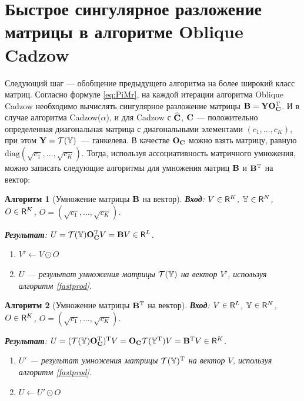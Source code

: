 \documentclass[12pt, specialist, subf,href,colorlinks=true,substylefile = spbu.rtx]{disser}
\newtheorem{algorithm}{Алгоритм}
\theoremstyle{remark}
\theoremstyle{definition}
\begin{document}

\section{Быстрое сингулярное разложение матрицы в алгоритме Oblique Cadzow}
Следующий шаг --- обобщение предыдущего алгоритма на более широкий класс матриц. Согласно формуле \eqref{eq:PiMr}, на каждой итерации алгоритма Oblique Cadzow необходимо вычислять сингулярное разложение матрицы $\mathbf{B} = \mathbf{Y} \mathbf{O}_{\mathbf{C}}^{\mathrm{T}}$. И в случае алгоритма Cadzow($\alpha$), и для Cadzow с $\widehat {\mathbf{C}}$, $\mathbf{C}$ --- положительно определенная диагональная матрица с диагональными элементами $(c_1, \ldots, c_K)$, при этом $\mathbf{Y} = \mathcal{T}(\mathbb{Y})$~--- ганкелева. В качестве $\mathbf{O}_{\mathbf{C}}$ можно взять матрицу, равную $\text{diag}(\sqrt{c_1}, \ldots, \sqrt{c_K})$. Тогда, используя ассоциативность матричного умножения, можно записать следующие алгоритмы для умножения матриц $\mathbf{B}$ и $\mathbf{B}^{\mathrm{T}}$ на вектор:
\begin{algorithm}[Умножение матрицы $\mathbf{B}$ на вектор]
	\textbf{Вход}: $V \in \mathsf{R}^K$, $\mathbb{Y} \in \mathsf{R}^N$, $O \in \mathsf{R}^K$, $O = (\sqrt{c_1}, \ldots, \sqrt{c_K})$.
	
	\textbf{Результат}:
	$U = \mathcal{T}(\mathbb{Y}) \mathbf{O}_{\mathbf{C}}^{\mathrm{T}} V = \mathbf{B} V \in \mathsf{R}^L$.
	
	\begin{enumerate}
		\item
		$V' \leftarrow V \odot O$
		\item
		$U$ --- результат умножения матрицы $\mathcal{T}(\mathbb{Y})$ на вектор $V'$, используя алгоритм \ref{fastprod}.
	\end{enumerate}
\end{algorithm}

\begin{algorithm}[Умножение матрицы $\mathbf{B}^{\mathrm{T}}$ на вектор]
	\textbf{Вход}: $V \in \mathsf{R}^L$, $\mathbb{Y} \in \mathsf{R}^N$, $O \in \mathsf{R}^K$, $O = (\sqrt{c_1}, \ldots, \sqrt{c_K})$.
	
	\textbf{Результат}:
	$U = (\mathcal{T}(\mathbb{Y}) \mathbf{O}_{\mathbf{C}}^{\mathrm{T}})^{\mathrm{T}} V = \mathbf{O}_{\mathbf{C}} \mathcal{T}(\mathbb{Y}^{\mathrm{T}}) V = \mathbf{B}^{\mathrm{T}} V \in \mathsf{R}^K$.
	
	\begin{enumerate}
		\item
		$U'$ --- результат умножения матрицы $\mathcal{T}(\mathbb{Y})^{\mathrm{T}}$ на вектор $V$, используя алгоритм \ref{fastprod}.
		\item
		$U \leftarrow U' \odot O$
	\end{enumerate}
\end{algorithm}
\end{document}
